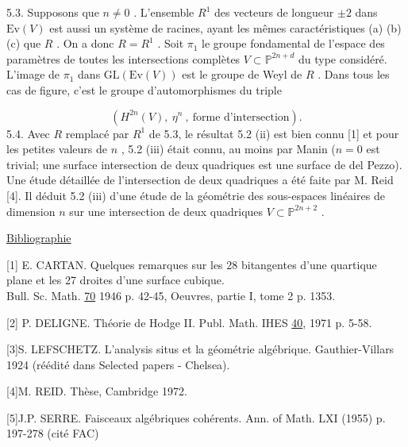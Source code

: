 5.3. \quad Supposons que $n \neq 0$ . L'ensemble $R^1$ des vecteurs de longueur $\pm 2$ dans $\mathrm{Ev}(V)$ est aussi un système de racines, ayant les mêmes caractéristiques (a) (b) (c) que $R$ . On a donc $R = R^1$ . Soit $\pi_1$ le groupe fondamental de l'espace des paramètres de toutes les intersections complètes $V \subset \mathbb{P}^{2n+d}$ du type considéré. L'image de $\pi_1$ dans $\mathrm{GL}(\mathrm{Ev}(V))$ est le groupe de Weyl de $R$ . Dans tous les cas de figure, c'est le groupe d'automorphismes du triple

\begin{equation*}
(H^{2n}(V),\ \eta^n\ ,\ \mbox{forme d'intersection}).
\end{equation*}
5.4. \quad Avec $R$ remplacé par $R^1$ de 5.3, le résultat 5.2 (ii) est bien connu [1] et pour les petites valeurs de $n$ , 5.2 (iii) était connu, au moins par Manin ($n = 0$ est trivial; une surface intersection de deux quadriques est une surface de del Pezzo). Une étude détaillée de l'intersection de deux quadriques a été faite par M. Reid [4]. Il déduit 5.2 (iii) d'une étude de la géométrie des sous-espaces linéaires de dimension $n$ sur une intersection de deux quadriques $V \subset \mathbb{P}^{2n+2}$ .


\underline{Bibliographie}

[1] \quad E. CARTAN. Quelques remarques sur les 28 bitangentes d'une quartique plane et les 27 droites d'une surface cubique.\\ Bull. Sc. Math. \underline{70} 1946 p. 42-45, Oeuvres, partie I, tome 2 p. 1353.

[2] \quad P. DELIGNE. Théorie de Hodge II. Publ. Math. IHES \underline{40}, 1971 p. 5-58.



[3]\quad S. LEFSCHETZ. L'analysis situs et la géométrie algébrique. Gauthier-Villars 1924 (réédité dans Selected papers - Chelsea).

[4]\quad M. REID. Thèse, Cambridge 1972.

[5]\quad J.P. SERRE. Faisceaux algébriques cohérents. Ann. of Math. LXI (1955) p. 197-278 (cité FAC)
